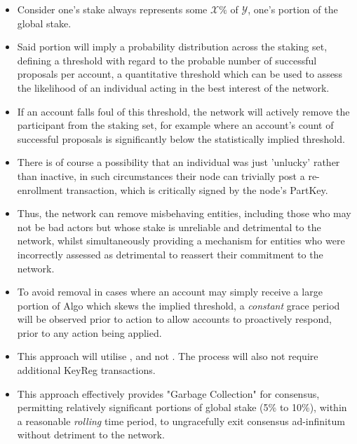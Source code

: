 \documentclass[11pt,a4paper]{article}
\begin{document}
\begin{itemize}
    \item Consider one's stake always represents some $\mathcal{X}\%$ of $\mathcal{Y}$, one's portion of the global 
          stake.
    \item Said portion will imply a probability distribution across the staking set, defining a threshold with regard to 
          the probable number of successful proposals per account, a quantitative threshold which can be used to assess 
          the likelihood of an individual acting in the best interest of the network.
    \item If an account falls foul of this threshold, the network will actively remove the participant from the staking
          set, for example where an account's count of successful proposals is significantly below the statistically 
          implied threshold.
    \item There is of course a possibility that an individual was just 'unlucky' rather than inactive, in such 
          circumstances their node can trivially post a re-enrollment transaction, which is critically signed by the 
          node's \gls{PartKey}.
    \item Thus, the network can remove misbehaving entities, including those who may not be bad actors but whose stake 
          is unreliable and detrimental to the network, whilst simultaneously providing a mechanism for entities who
          were incorrectly assessed as detrimental to reassert their commitment to the network.
    \item To avoid removal in cases where an account may simply receive a large portion of Algo which skews the implied 
          threshold, a \emph{constant} grace period will be observed prior to action to allow accounts to proactively
          respond, prior to any action being applied.
    \item This approach will utilise , and not . The process will
          also not require additional \gls{KeyReg} transactions.
    \item This approach effectively provides "Garbage Collection" for consensus, permitting relatively significant 
          portions of global stake (5\% to 10\%), within a reasonable \emph{rolling} time period, to ungracefully exit 
          consensus ad-infinitum without detriment to the network. 
\end{itemize} \mbox{} \\
\end{document}
